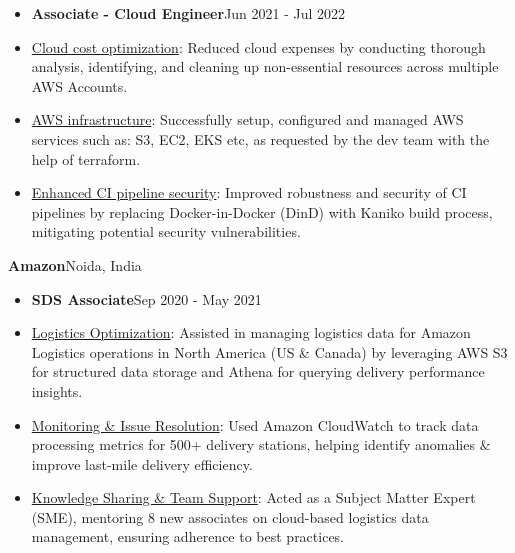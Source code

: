 \documentclass[11pt,a4paper]{article}
\newenvironment{dashlist}{
  \begin{itemize}[label={--}]
}{
  \end{itemize}
}
\begin{document}
\medskip

\begin{itemize}
\item \textbf{Associate - Cloud Engineer}\hfill Jun 2021 - Jul 2022
\end{itemize}
\begin{dashlist}
    \item \uline {Cloud cost optimization}: Reduced cloud expenses by conducting thorough analysis, identifying, and cleaning up non-essential resources across multiple AWS Accounts.
    \item \uline {AWS infrastructure}: Successfully setup, configured and managed AWS services such as: S3, EC2, EKS etc, as requested by the dev team with the help of terraform. 
    \item \uline {Enhanced CI pipeline security}: Improved robustness and security of CI pipelines by replacing Docker-in-Docker (DinD) with Kaniko build process, mitigating potential security vulnerabilities.
\end{dashlist}

\noindent\textbf{Amazon}\hfill Noida, India
\begin{itemize}
\item \textbf{SDS Associate}\hfill Sep 2020 - May 2021
\end{itemize}
\begin{dashlist}
    \item \uline {Logistics Optimization}: Assisted in managing logistics data for Amazon Logistics operations in North America (US \& Canada) by leveraging AWS S3 for structured data storage and Athena for querying delivery performance insights.
    \item \uline {Monitoring \& Issue Resolution}: Used Amazon CloudWatch to track data processing metrics for 500+ delivery stations, helping identify anomalies \& improve last-mile delivery efficiency.
    \item  \uline {Knowledge Sharing \& Team Support}: Acted as a Subject Matter Expert (SME), mentoring 8 new associates on cloud-based logistics data management, ensuring adherence to best practices.
\end{dashlist}
\end{document}
